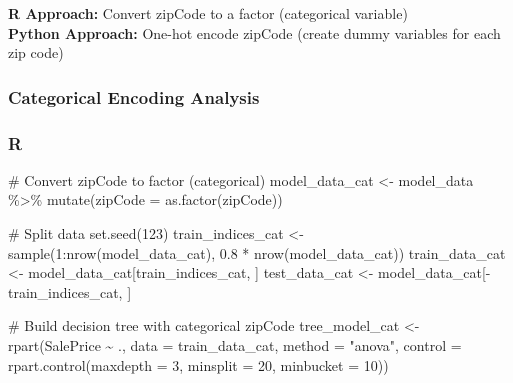 \documentclass[
  letterpaper,
  DIV=11,
  numbers=noendperiod]{scrartcl}
\newenvironment{Shaded}{\begin{snugshade}}{\end{snugshade}}
\newcommand{\AttributeTok}[1]{\textcolor[rgb]{0.40,0.45,0.13}{#1}}
\newcommand{\CommentTok}[1]{\textcolor[rgb]{0.37,0.37,0.37}{#1}}
\newcommand{\DecValTok}[1]{\textcolor[rgb]{0.68,0.00,0.00}{#1}}
\newcommand{\FloatTok}[1]{\textcolor[rgb]{0.68,0.00,0.00}{#1}}
\newcommand{\FunctionTok}[1]{\textcolor[rgb]{0.28,0.35,0.67}{#1}}
\newcommand{\NormalTok}[1]{\textcolor[rgb]{0.00,0.23,0.31}{#1}}
\newcommand{\OtherTok}[1]{\textcolor[rgb]{0.00,0.23,0.31}{#1}}
\newcommand{\SpecialCharTok}[1]{\textcolor[rgb]{0.37,0.37,0.37}{#1}}
\newcommand{\StringTok}[1]{\textcolor[rgb]{0.13,0.47,0.30}{#1}}
\begin{document}
\textbf{R Approach:} Convert zipCode to a factor (categorical
variable)\\
\textbf{Python Approach:} One-hot encode zipCode (create dummy variables
for each zip code)

\subsubsection{Categorical Encoding
Analysis}\label{categorical-encoding-analysis}

\subsubsection{R}

\begin{Shaded}
\begin{Highlighting}[]
\CommentTok{\# Convert zipCode to factor (categorical)}
\NormalTok{model\_data\_cat }\OtherTok{\textless{}{-}}\NormalTok{ model\_data }\SpecialCharTok{\%\textgreater{}\%}
  \FunctionTok{mutate}\NormalTok{(}\AttributeTok{zipCode =} \FunctionTok{as.factor}\NormalTok{(zipCode))}

\CommentTok{\# Split data}
\FunctionTok{set.seed}\NormalTok{(}\DecValTok{123}\NormalTok{)}
\NormalTok{train\_indices\_cat }\OtherTok{\textless{}{-}} \FunctionTok{sample}\NormalTok{(}\DecValTok{1}\SpecialCharTok{:}\FunctionTok{nrow}\NormalTok{(model\_data\_cat), }\FloatTok{0.8} \SpecialCharTok{*} \FunctionTok{nrow}\NormalTok{(model\_data\_cat))}
\NormalTok{train\_data\_cat }\OtherTok{\textless{}{-}}\NormalTok{ model\_data\_cat[train\_indices\_cat, ]}
\NormalTok{test\_data\_cat }\OtherTok{\textless{}{-}}\NormalTok{ model\_data\_cat[}\SpecialCharTok{{-}}\NormalTok{train\_indices\_cat, ]}

\CommentTok{\# Build decision tree with categorical zipCode}
\NormalTok{tree\_model\_cat }\OtherTok{\textless{}{-}} \FunctionTok{rpart}\NormalTok{(SalePrice }\SpecialCharTok{\textasciitilde{}}\NormalTok{ ., }
                        \AttributeTok{data =}\NormalTok{ train\_data\_cat,}
                        \AttributeTok{method =} \StringTok{"anova"}\NormalTok{,}
                        \AttributeTok{control =} \FunctionTok{rpart.control}\NormalTok{(}\AttributeTok{maxdepth =} \DecValTok{3}\NormalTok{, }
                                              \AttributeTok{minsplit =} \DecValTok{20}\NormalTok{, }
                                              \AttributeTok{minbucket =} \DecValTok{10}\NormalTok{))}


\end{Highlighting}
\end{Shaded}
\end{document}
